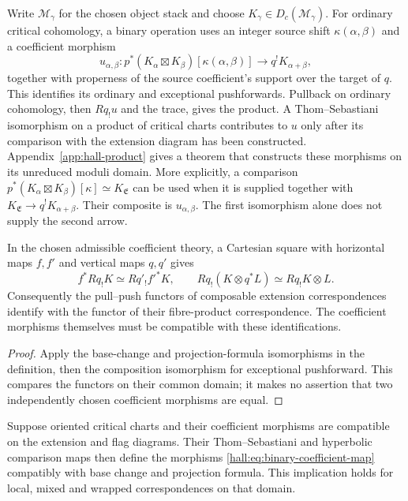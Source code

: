 Write $\mathcal M_\gamma$ for the chosen object stack and
choose $K_\gamma\in D_c(\mathcal M_\gamma)$.
For ordinary critical cohomology, a binary operation uses an
integer source shift $\kappa(\alpha,\beta)$ and a coefficient morphism
\begin{equation}
\label{hall:eq:binary-coefficient-map}
 u_{\alpha,\beta}:
 p^*(K_\alpha\boxtimes K_\beta)[\kappa(\alpha,\beta)]
 \longrightarrow q^!K_{\alpha+\beta},
\end{equation}
together with properness of the source coefficient's support
over the target of $q$. This identifies its ordinary and
exceptional pushforwards. Pullback on ordinary cohomology,
then $Rq_!u$ and the trace, gives the product.
A Thom--Sebastiani isomorphism on a
product of critical charts contributes to $u$ only after its
comparison with the extension diagram has been constructed.
Appendix~\ref{app:hall-product} gives a theorem that constructs
these morphisms on its unreduced moduli domain.
More explicitly, a comparison
$p^*(K_\alpha\boxtimes K_\beta)[\kappa]\simeq K_{\mathfrak E}$
can be used when it is supplied together with
$K_{\mathfrak E}\to q^!K_{\alpha+\beta}$. Their composite is
$u_{\alpha,\beta}$. The first isomorphism alone does not supply
the second arrow.

\begin{proposition}
\label{prop:mixed-correspondence-base-change}
\label{prop:mixed-correspondence-projection-formula}
In the chosen admissible coefficient theory, a Cartesian square
with horizontal maps $f,f'$ and vertical maps $q,q'$ gives
\[
 f^*Rq_!K\simeq Rq'_!f'^*K,
 \qquad
 Rq_!(K\otimes q^*L)\simeq Rq_!K\otimes L.
\]
Consequently the pull--push functors of composable extension
correspondences identify with the functor of their fibre-product
correspondence. The coefficient morphisms themselves must be
compatible with these identifications.
\end{proposition}

\begin{proof}
Apply the base-change and projection-formula isomorphisms in the
definition, then the composition isomorphism for exceptional
pushforward. This compares the functors on their common domain;
it makes no assertion that two independently chosen coefficient
morphisms are equal.
\end{proof}

\begin{proposition}
\label{prop:mixed-correspondence-thom-sebastiani}
Suppose oriented critical charts and their coefficient morphisms
are compatible on the extension and flag diagrams. Their
Thom--Sebastiani and hyperbolic comparison maps then define the
morphisms \eqref{hall:eq:binary-coefficient-map} compatibly with
base change and projection formula. This implication holds for
local, mixed and wrapped correspondences on that domain.
\end{proposition}

